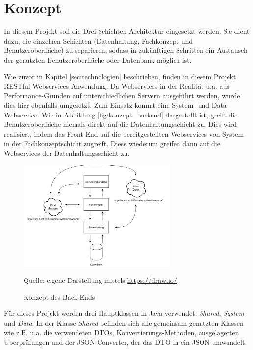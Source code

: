 \section{Konzept}
\label{sec:konzept}
\authorsection{\authorSG}
In diesem Projekt soll die Drei-Schichten-Architektur eingesetzt werden.
Sie dient dazu, die einzelnen Schichten (Datenhaltung, Fachkonzept und Benutzeroberfläche) zu separieren, sodass in zukünftigen Schritten ein Austausch der genutzten Benutzeroberfläche oder Datenbank möglich ist. 

Wie zuvor in Kapitel \vref{sec:technologien} beschrieben, finden in diesem Projekt \acs{REST}ful Webservices Anwendung.
Da Webservices in der Realität u.a. aus Performance-Gründen auf unterschiedlichen Servern ausgeführt werden, wurde dies hier ebenfalls umgesetzt.
Zum Einsatz kommt eine System- und Data-Webservice.
Wie in Abbildung \vref{fig:konzept_backend} dargestellt ist, greift die Benutzeroberfläche niemals direkt auf die Datenhaltungsschicht zu.
Dies wird realisiert, indem das Front-End auf die bereitgestellten Webservices von System in der Fachkonzeptschicht zugreift. 
Diese wiederum greifen dann auf die Webservices der Datenhaltungsschicht zu.

\begin{figure}[ht]
	\centering
	\includegraphics[width=0.7\textwidth]{img/backend/rest}
	\captionsetup{format=hang}
	\caption{Konzept des Back-Ends}
	\small Quelle: eigene Darstellung mittels \url{https://draw.io/}
	\label{fig:konzept_backend}
	\end{figure}

Für dieses Projekt werden drei Hauptklassen in Java verwendet: \textit{Shared}, \textit{System} und \textit{Data}. 
In der Klasse \textit{Shared} befinden sich alle gemeinsam genutzten Klassen wie z.B. u.a. die verwendeten \acp{DTO}, Konvertierungs-Methoden, ausgelagerten Überprüfungen und der \acs{JSON}-Converter, der das \acs{DTO} in ein \acs{JSON} umwandelt. 

